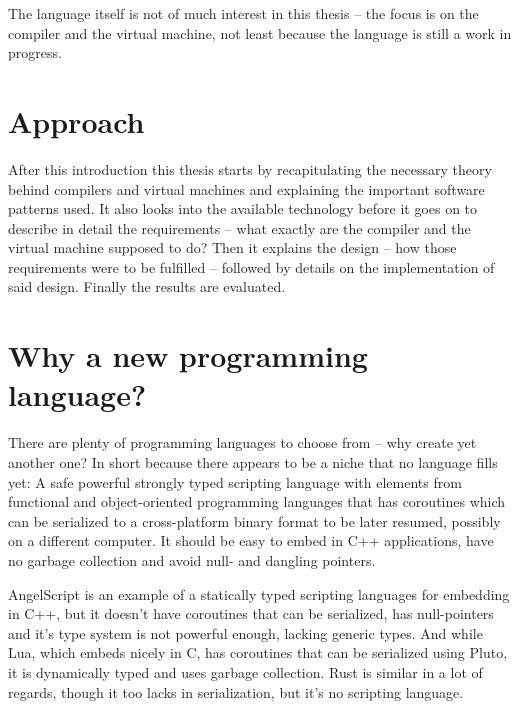 	The language itself is not of much interest in this thesis -- the focus is on the compiler and the virtual machine, not least because the language is still a work in progress.
    
    
	\section{Approach} %
	
	After this introduction this thesis starts by recapitulating the necessary theory behind compilers and virtual machines and explaining the important software patterns used. It also looks into the available technology before it goes on to describe in detail the requirements -- what exactly are the compiler and the virtual machine supposed to do? Then it explains the design -- how those requirements were to be fulfilled -- followed by details on the implementation of said design. Finally the results are evaluated.
	
	
	\section{Why a new programming language?}
	
	There are plenty of programming languages to choose from -- why create yet another one? In short because there appears to be a niche that no language fills yet: A safe powerful strongly typed scripting language with elements from functional and object-oriented programming languages that has coroutines which can be serialized to a cross-platform binary format to be later resumed, possibly on a different computer. It should be easy to embed in C++ applications, have no garbage collection and avoid null- and dangling pointers.
	
	AngelScript\cite{angelscript} is an example of a statically typed scripting languages for embedding in C++, but it doesn't have coroutines that can be serialized, has null-pointers and it's type system is not powerful enough, lacking generic types. And while Lua\cite{lua}, which embeds nicely in C, has coroutines that can be serialized using Pluto\cite{pluto}, it is dynamically typed and uses garbage collection. Rust\cite{rust} is similar in a lot of regards, though it too lacks in serialization, but it's no scripting language.
	
